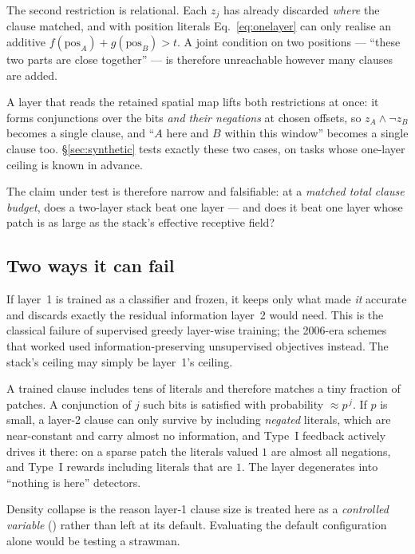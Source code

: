 The second restriction is relational. Each $z_j$ has already discarded \emph{where} the
clause matched, and with position literals Eq.~\ref{eq:onelayer} can only realise an additive
$f(\mathrm{pos}_A) + g(\mathrm{pos}_B) > t$. A joint condition on two positions --- ``these
two parts are close together'' --- is therefore unreachable however many clauses are added.

A layer that reads the retained spatial map lifts both restrictions at once: it forms
conjunctions over the bits \emph{and their negations} at chosen offsets, so
$z_A \wedge \neg z_B$ becomes a single clause, and ``$A$ here and $B$ within this window''
becomes a single clause too. \S\ref{sec:synthetic} tests exactly these two cases, on tasks
whose one-layer ceiling is known in advance.

\begin{ttkey}
The claim under test is therefore narrow and falsifiable: at a \emph{matched total clause
budget}, does a two-layer stack beat one layer --- and does it beat one layer whose patch is
as large as the stack's effective receptive field?
\end{ttkey}

\subsection{Two ways it can fail}

 If layer~1 is trained as a classifier and frozen, it keeps only
what made \emph{it} accurate and discards exactly the residual information layer~2 would
need. This is the classical failure of supervised greedy layer-wise training; the 2006-era
schemes that worked used information-preserving unsupervised objectives instead. The stack's
ceiling may simply be layer~1's ceiling.

 A trained \ctm clause includes tens of literals and therefore
matches a tiny fraction of patches. A conjunction of $j$ such bits is satisfied with
probability $\approx p^{\,j}$. If $p$ is small, a layer-2 clause can only survive by
including \emph{negated} literals, which are near-constant and carry almost no information,
and Type~I feedback actively drives it there: on a sparse patch the literals valued $1$ are
almost all negations, and Type~I rewards including literals that are $1$. The layer
degenerates into ``nothing is here'' detectors.

Density collapse is the reason layer-1 clause size is treated here as a \emph{controlled
variable} () rather than left at its default. Evaluating the
default configuration alone would be testing a strawman.
